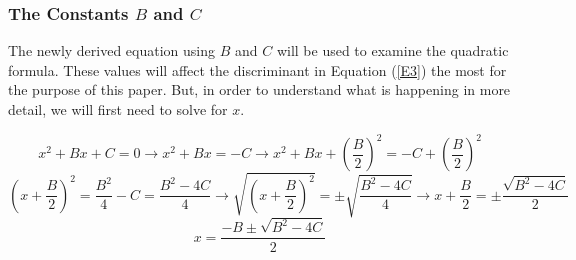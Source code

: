 \documentclass[14pt]{extarticle}
\begin{document}
\subsubsection{The Constants $B$ and $C$}

\indent The newly derived equation using $B$ and $C$ will be used to examine the quadratic formula. These values will affect the discriminant in Equation (\ref{E3}) the most for the purpose of this paper. But, in order to understand what is happening in more detail, we will first need to solve for $x$.

$$x^2+Bx+C=0 \to x^2+Bx=-C\to x^2+Bx+(\frac{B}{2})^2=-C+(\frac{B}{2})^2$$
$$(x+\frac{B}{2})^2 = \frac{B^2}{4}-C = \frac{B^2-4C}{4}\to \sqrt{(x+\frac{B}{2})^2}=\pm\sqrt{\frac{B^2-4C}{4}} \to x+\frac{B}{2} = \pm\frac{\sqrt{B^2-4C}}{2}$$
\begin{equation}
x=\frac{-B\pm\sqrt{B^2-4C}}{2}
\label{E6}
\end{equation}
\end{document}
